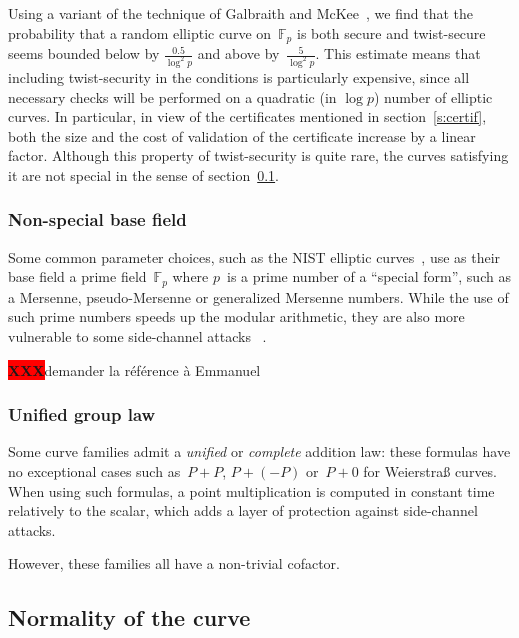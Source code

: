 \documentclass[twocolumn,letterpaper,10pt]{article}
\def\F{\mathbb{F}}
\def\XXX{{\colorbox{red}{{\color{white}\bfseries XXX}}}}
\begin{document}
Using a variant of the technique of Galbraith and McKee~\cite{lms2000gm},
we find that the probability that a random elliptic curve on~$\F_p$
is both secure and twist-secure
seems bounded below by $\frac{0.5}{\log^2 p}$
and above by~$\frac{5}{\log^2 p}$.
This estimate means that
including twist-security in the conditions is particularly expensive,
since all necessary checks will be performed on
a quadratic (in $\log p$) number of elliptic curves.
In particular, in view of
the certificates mentioned in section~\ref{s:certif},
both the size and the cost of validation of the certificate
increase by a linear factor.
Although this property of twist-security is quite rare,
the curves satisfying it are not special
in the sense of section~\ref{ss:normal}.

\subsubsection{Non-special base field}
\label{sss:special-side}

Some common parameter choices,
such as the NIST elliptic curves~\cite{nist2000fips186-2},
use as their base field a prime field~$\F_p$
where $p$~is a prime number of a ``special form'',
such as a Mersenne, pseudo-Mersenne or generalized Mersenne numbers.
While the use of such prime numbers speeds up the modular arithmetic,
they are also more vulnerable to some side-channel attacks%
~\cite{ches2005dkj,ics2005ss,ches2014bpsy,eprint2014-434}.

\XXX demander la référence à Emmanuel

\subsubsection{Unified group law}
\label{sss:unified}

Some curve families admit a \emph{unified} or \emph{complete}
addition law: these formulas have no exceptional cases
such as~$P + P$, $P + (-P)$ or~$P + 0$ for Weierstraß curves.
When using such formulas, a point multiplication
is computed in constant time relatively to the scalar,
which adds a layer of protection against side-channel attacks.

However, these families all have a non-trivial cofactor.

\subsection{Normality of the curve}
\label{ss:normal}
\end{document}
